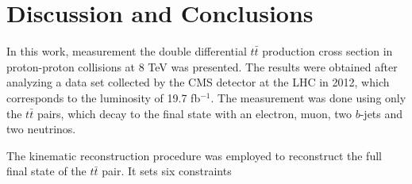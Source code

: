 \chapter{Discussion and Conclusions}\label{chapt:conc}

In this work, measurement the double differential $t\bar{t}$ production cross section in proton-proton collisions at 8 TeV was presented.
The results were obtained after analyzing a data set collected by the CMS detector at the LHC in 2012, which corresponds to the 
luminosity of 19.7 fb$^{-1}$. The measurement was done using only the $t\bar{t}$ pairs, which decay to the final state with an
electron, muon, two $b$-jets and two neutrinos.

The kinematic reconstruction procedure was employed to reconstruct the full final state of the $t\bar{t}$ pair. It sets six constraints 

